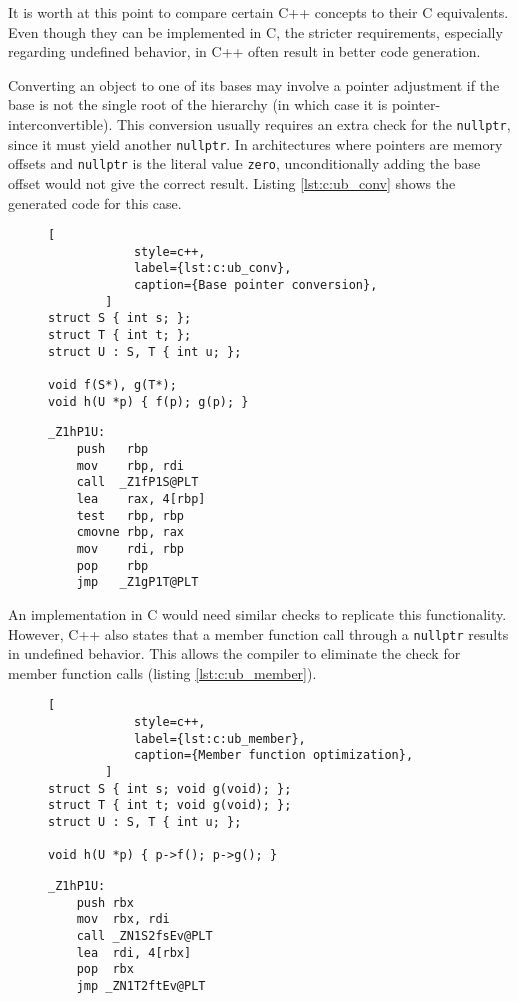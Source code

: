 It is worth at this point to compare certain C++ concepts to their C
equivalents.  Even though they can be implemented in C, the stricter
requirements, especially regarding undefined behavior, in C++ often result in
better code generation.

Converting an object to one of its bases may involve a pointer adjustment if the
base is not the single root of the hierarchy (in which case it is
pointer-interconvertible).  This conversion usually requires an extra check for
the \texttt{nullptr}, since it must yield another \texttt{nullptr}.  In
architectures where pointers are memory offsets and \texttt{nullptr} is the
literal value \texttt{zero}, unconditionally adding the base offset would not
give the correct result.  Listing \ref{lst:c:ub_conv} shows the generated code
for this case.

\begin{figure}[ht]
    \centering
    \begin{multicols}{2}
        \begin{lstlisting}[
            style=c++,
            label={lst:c:ub_conv},
            caption={Base pointer conversion},
        ]
struct S { int s; };
struct T { int t; };
struct U : S, T { int u; };

void f(S*), g(T*);
void h(U *p) { f(p); g(p); }
        \end{lstlisting}
        \columnbreak
        \begin{lstlisting}[style=x86]
_Z1hP1U:
    push   rbp
    mov    rbp, rdi
    call  _Z1fP1S@PLT
    lea    rax, 4[rbp]
    test   rbp, rbp
    cmovne rbp, rax
    mov    rdi, rbp
    pop    rbp
    jmp   _Z1gP1T@PLT
        \end{lstlisting}
    \end{multicols}
\end{figure}

An implementation in C would need similar checks to replicate this
functionality.  However, C++ also states that a member function call through a
\texttt{nullptr} results in undefined behavior.  This allows the compiler to
eliminate the check for member function calls (listing \ref{lst:c:ub_member}).

\begin{figure}[ht]
    \centering
    \begin{multicols}{2}
        \begin{lstlisting}[
            style=c++,
            label={lst:c:ub_member},
            caption={Member function optimization},
        ]
struct S { int s; void g(void); };
struct T { int t; void g(void); };
struct U : S, T { int u; };

void h(U *p) { p->f(); p->g(); }
        \end{lstlisting}
        \columnbreak
        \begin{lstlisting}[style=x86]
_Z1hP1U:
    push rbx
    mov  rbx, rdi
    call _ZN1S2fsEv@PLT
    lea  rdi, 4[rbx]
    pop  rbx
    jmp _ZN1T2ftEv@PLT
        \end{lstlisting}
    \end{multicols}
\end{figure}
